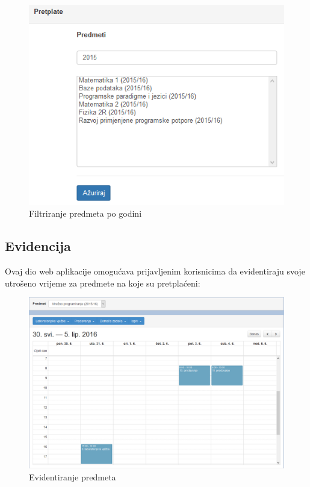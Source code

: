 \documentclass[times, utf8, zavrsni]{fer}
\begin{document}
\begin{figure}[H]
\centering
\includegraphics[scale=0.85]{img/filtriranje.png}
\caption{Filtriranje predmeta po godini}
\label{fig:filtriranje}
\end{figure}
\clearpage

\subsection{Evidencija}
Ovaj dio web aplikacije omogućava prijavljenim korisnicima da evidentiraju svoje utrošeno vrijeme za predmete na koje su pretplaćeni:

\begin{figure}[H]
\centering
\includegraphics[width=\textwidth,height=\textheight,keepaspectratio]{img/evidencija-web.png}
\caption{Evidentiranje predmeta}
\label{fig:evidencija-web}
\end{figure}
\end{document}
